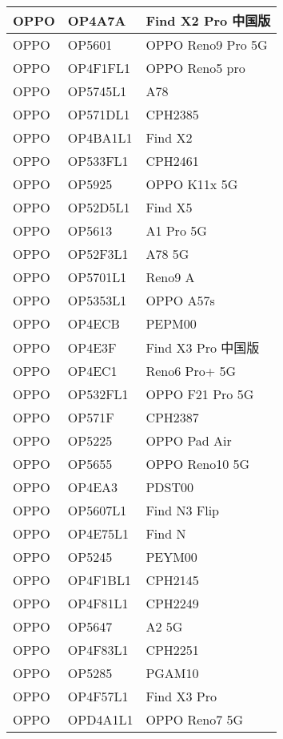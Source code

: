 \begin{tabularx}{\linewidth}{|l|X|X|}
        OPPO & OP4A7A & Find X2 Pro 中国版 \\ \hline
        OPPO & OP5601 & OPPO Reno9 Pro 5G \\ \hline
        OPPO & OP4F1FL1 & OPPO Reno5 pro \\ \hline
        OPPO & OP5745L1 & A78 \\ \hline
        OPPO & OP571DL1 & CPH2385 \\ \hline
        OPPO & OP4BA1L1 & Find X2 \\ \hline
        OPPO & OP533FL1 & CPH2461 \\ \hline
        OPPO & OP5925 & OPPO K11x 5G \\ \hline
        OPPO & OP52D5L1 & Find X5 \\ \hline
        OPPO & OP5613 & A1 Pro 5G \\ \hline
        OPPO & OP52F3L1 & A78 5G \\ \hline
        OPPO & OP5701L1 & Reno9 A \\ \hline
        OPPO & OP5353L1 & OPPO A57s \\ \hline
        OPPO & OP4ECB & PEPM00 \\ \hline
        OPPO & OP4E3F & Find X3 Pro 中国版 \\ \hline
        OPPO & OP4EC1 & Reno6 Pro+ 5G \\ \hline
        OPPO & OP532FL1 & OPPO F21 Pro 5G \\ \hline
        OPPO & OP571F & CPH2387 \\ \hline
        OPPO & OP5225 & OPPO Pad Air \\ \hline
        OPPO & OP5655 & OPPO Reno10 5G \\ \hline
        OPPO & OP4EA3 & PDST00 \\ \hline
        OPPO & OP5607L1 & Find N3 Flip \\ \hline
        OPPO & OP4E75L1 & Find N \\ \hline
        OPPO & OP5245 & PEYM00 \\ \hline
        OPPO & OP4F1BL1 & CPH2145 \\ \hline
        OPPO & OP4F81L1 & CPH2249 \\ \hline
        OPPO & OP5647 & A2 5G \\ \hline
        OPPO & OP4F83L1 & CPH2251 \\ \hline
        OPPO & OP5285 & PGAM10 \\ \hline
        OPPO & OP4F57L1 & Find X3 Pro \\ \hline
        OPPO & OPD4A1L1 & OPPO Reno7 5G \\ \hline

\end{tabularx}
